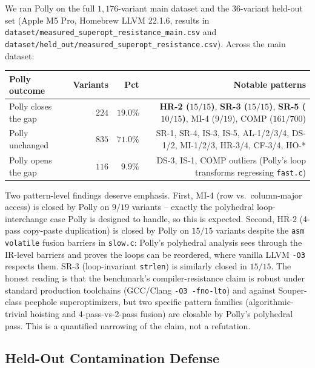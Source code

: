 We ran Polly on the full $1{,}176$-variant main dataset and the $36$-variant held-out set (Apple M5 Pro, Homebrew LLVM 22.1.6, results in \texttt{dataset/measured\_superopt\_resistance\_main.csv} and \texttt{dataset/held\_out/measured\_superopt\_resistance.csv}). Across the main dataset:

\begin{center}
\begin{tabular}{lrrr}
\toprule
\textbf{Polly outcome} & \textbf{Variants} & \textbf{Pct} & \textbf{Notable patterns}\\
\midrule
Polly closes the gap   & $224$ & $19.0\%$ & \textbf{HR-2 ($15/15$)}, \textbf{SR-3 ($15/15$)}, \textbf{SR-5 ($10/15$)}, MI-4 ($9/19$), COMP ($161/700$) \\
Polly unchanged        & $835$ & $71.0\%$ & SR-1, SR-4, IS-3, IS-5, AL-1/2/3/4, DS-1/2, MI-1/2/3, HR-3/4, CF-3/4, HO-* \\
Polly opens the gap    & $116$ & $9.9\%$ & DS-3, IS-1, COMP outliers (Polly's loop transforms regressing \texttt{fast.c}) \\
\bottomrule
\end{tabular}
\end{center}

Two pattern-level findings deserve emphasis. First, MI-4 (row vs.\ column-major access) is closed by Polly on $9/19$ variants -- exactly the polyhedral loop-interchange case Polly is designed to handle, so this is expected. Second, HR-2 (4-pass copy-paste duplication) is closed by Polly on $15/15$ variants despite the \texttt{asm volatile} fusion barriers in \texttt{slow.c}: Polly's polyhedral analysis sees through the IR-level barriers and proves the loops can be reordered, where vanilla LLVM \texttt{-O3} respects them. SR-3 (loop-invariant \texttt{strlen}) is similarly closed in $15/15$. The honest reading is that the benchmark's compiler-resistance claim is robust under standard production toolchains (GCC/Clang \texttt{-O3 -fno-lto}) and against Souper-class peephole superoptimizers, but two specific pattern families (algorithmic-trivial hoisting and 4-pass-vs-2-pass fusion) are closable by Polly's polyhedral pass. This is a quantified narrowing of the claim, not a refutation.

\subsection{Held-Out Contamination Defense}\label{subsec:heldout}

